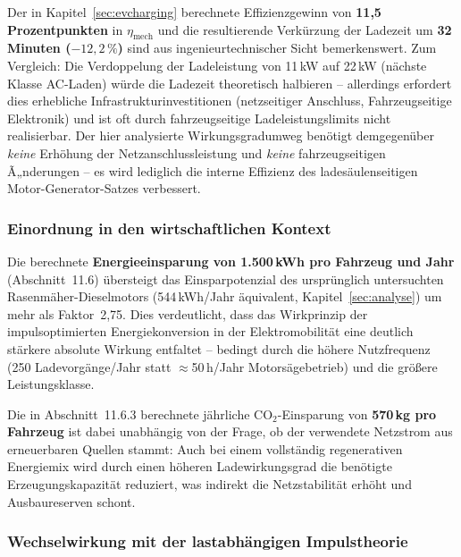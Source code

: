 ﻿\documentclass[a4paper,12pt]{article}
\begin{document}
Der in Kapitel~\ref{sec:evcharging} berechnete Effizienzgewinn von
\textbf{11{,}5 Prozentpunkten} in $\eta_\text{mech}$ und die resultierende
Verkürzung der Ladezeit um \textbf{32 Minuten ($-12{,}2\,\%$)} sind aus
ingenieurtechnischer Sicht bemerkenswert. Zum Vergleich: Die
Verdoppelung der Ladeleistung von 11\,kW auf 22\,kW (nächste Klasse AC-Laden)
würde die Ladezeit theoretisch halbieren -- allerdings erfordert dies
erhebliche Infrastrukturinvestitionen (netzseitiger Anschluss, Fahrzeugseitige
Elektronik) und ist oft durch fahrzeugseitige Ladeleistungslimits nicht
realisierbar. Der hier analysierte Wirkungsgradumweg benötigt demgegenüber
\textit{keine} Erhöhung der Netzanschlussleistung und \textit{keine}
fahrzeugseitigen Ã„nderungen -- es wird lediglich die interne Effizienz
des ladesäulenseitigen Motor-Generator-Satzes verbessert.

\subsubsection*{Einordnung in den wirtschaftlichen Kontext}

Die berechnete \textbf{Energieeinsparung von 1.500\,kWh pro Fahrzeug und Jahr}
(Abschnitt~11.6) übersteigt das Einsparpotenzial des ursprünglich untersuchten
Rasenmäher-Dieselmotors (544\,kWh/Jahr äquivalent, Kapitel~\ref{sec:analyse})
um mehr als Faktor~2{,}75. Dies verdeutlicht, dass das Wirkprinzip der
impulsoptimierten Energiekonversion in der Elektromobilität eine deutlich
stärkere absolute Wirkung entfaltet -- bedingt durch die höhere Nutzfrequenz
(250 Ladevorgänge/Jahr statt $\approx$50\,h/Jahr Motorsägebetrieb) und
die größere Leistungsklasse.

Die in Abschnitt~11.6.3 berechnete jährliche CO${}_2$-Einsparung von
\textbf{570\,kg pro Fahrzeug} ist dabei unabhängig von der Frage,
ob der verwendete Netzstrom aus erneuerbaren Quellen stammt: Auch bei
einem vollständig regenerativen Energiemix wird durch einen höheren
Ladewirkungsgrad die benötigte Erzeugungskapazität reduziert,
was indirekt die Netzstabilität erhöht und Ausbaureserven schont.

\subsubsection*{Wechselwirkung mit der lastabhängigen Impulstheorie}
\end{document}
